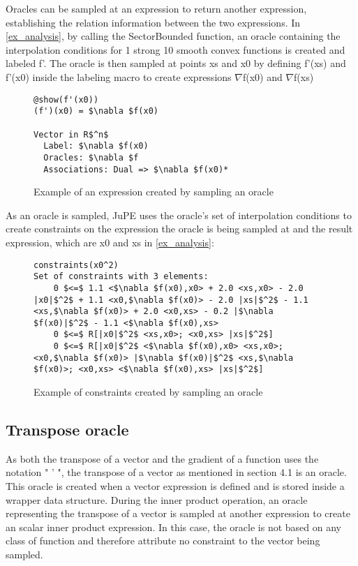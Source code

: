 Oracles can be sampled at an expression to return another expression, establishing the relation information between the two expressions.  In \ref{ex_analysis}, by calling the SectorBounded function, an oracle containing the interpolation conditions for 1 strong 10 smooth convex functions is created and labeled f'. The oracle is then sampled at points xs and x0 by defining f'(xs) and f'(x0) inside the labeling macro to create expressions $\nabla $f(x0) and $\nabla $f(xs)

\begin{figure}[!h]
	\begin{lstlisting}[mathescape]
@show(f'(x0))
(f')(x0) = $\nabla $f(x0)

Vector in R$^n$
  Label: $\nabla $f(x0)
  Oracles: $\nabla $f
  Associations: Dual => $\nabla $f(x0)*

\end{lstlisting}
\caption{Example of an expression created by sampling an oracle}
\label{ex_sampling}
\end{figure}

As an oracle is sampled, JuPE uses the oracle's set of interpolation conditions to create constraints on the expression the oracle is being sampled at and the result expression, which are x0 and xs in \ref{ex_analysis}:

\begin{figure}[!h]
	\begin{lstlisting}[mathescape]
constraints(x0^2)
Set of constraints with 3 elements:
	0 $<=$ 1.1 <$\nabla $f(x0),x0> + 2.0 <xs,x0> - 2.0 |x0|$^2$ + 1.1 <x0,$\nabla $f(x0)> - 2.0 |xs|$^2$ - 1.1 <xs,$\nabla $f(x0)> + 2.0 <x0,xs> - 0.2 |$\nabla $f(x0)|$^2$ - 1.1 <$\nabla $f(x0),xs>
	0 $<=$ R[|x0|$^2$ <xs,x0>; <x0,xs> |xs|$^2$]
	0 $<=$ R[|x0|$^2$ <$\nabla $f(x0),x0> <xs,x0>; <x0,$\nabla $f(x0)> |$\nabla $f(x0)|$^2$ <xs,$\nabla $f(x0)>; <x0,xs> <$\nabla $f(x0),xs> |xs|$^2$]
	\end{lstlisting}
	\caption{Example of constraints created by sampling an oracle}
	\label{ex_orc_constraints}
\end{figure}

\subsection*{Transpose oracle}

As both the transpose of a vector and the gradient of a function uses the notation " ' ", the transpose of a vector as mentioned in section 4.1 is an oracle. This oracle is created when a vector expression is defined and is stored inside a wrapper data structure. During the inner product operation, an oracle representing the transpose of a vector is sampled at another expression to create an scalar inner product expression. In this case, the oracle is not based on any class of function and therefore attribute no constraint to the vector being sampled. 

